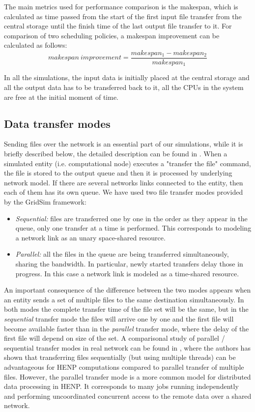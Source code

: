 \documentclass{svjour3}                     %
\begin{document}
The main metrics used for performance comparison is the makespan, which is calculated as time passed from the start of the first input file transfer from the central storage until the finish time of the last output file transfer to it. For comparison of two scheduling policies, a makespan improvement can be calculated as follows:
\begin{equation}
\label{makespanImprovement}
 makespan~improvement = \frac{makespan_{1} - makespan_{2}}{makespan_{1}} 
\end{equation}

In all the simulations, the input data is initially placed at the central storage and all the output data has to be transferred back to it, all the CPUs in the system are free at the initial moment of time.

\subsection{Data transfer modes}

Sending files over the network is an essential part of our simulations, while it is briefly described below, the detailed description can be found in \cite{GridSimNetwork}. When a simulated entity (i.e. computational node) executes a "transfer the file" command, the file is stored to the output queue and then it is processed by underlying network model. If there are several networks links connected to the entity, then each of them has its own queue. We have used two file transfer modes provided by the GridSim framework:
\begin{itemize}
\item \textit{Sequential:} files are transferred one by one in the order as they appear in the queue, only one transfer at a time is performed. This corresponds to modeling a network link as an unary space-shared resource.
\item \textit{Parallel:} all the files in the queue are being transferred simultaneously, sharing the bandwidth.  In particular, newly started transfers delay those in progress. In this case a network link is modeled as a time-shared resource.
\end{itemize}
An important consequence of the difference between the two modes appears when an entity sends a set of multiple files to the same destination simultaneously. In both modes the complete transfer time of the file set will be the same, but in the \textit{sequential} transfer mode the files will arrive one by one and the first file will become available faster than in the \textit{parallel} transfer mode, where the delay of the first file will depend on size of the set. A comparisonal study of parallel / sequential transfer modes in real network can be found in \cite{Zerola}, where the authors has shown that transferring files sequentially (but using multiple threads) can be advantageous for HENP computations compared to parallel transfer of multiple files. However, the parallel transfer mode is a more common model for distributed data processing in HENP. It corresponds to many jobs running independently and performing uncoordinated concurrent access to the remote data over a shared network.
\end{document}
